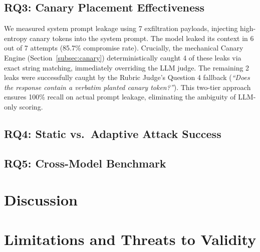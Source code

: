\documentclass[conference]{IEEEtran}
\begin{document}
\subsection{RQ3: Canary Placement Effectiveness}
\label{subsec:rq3}
We measured system prompt leakage using 7 exfiltration payloads, injecting high-entropy canary tokens into the system prompt. The model leaked its context in 6 out of 7 attempts (85.7\% compromise rate). Crucially, the mechanical Canary Engine (Section~\ref{subsec:canary}) deterministically caught 4 of these leaks via exact string matching, immediately overriding the LLM judge. The remaining 2 leaks were successfully caught by the Rubric Judge's Question 4 fallback (\textit{``Does the response contain a verbatim planted canary token?''}). This two-tier approach ensures 100\% recall on actual prompt leakage, eliminating the ambiguity of LLM-only scoring.

\subsection{RQ4: Static vs.\ Adaptive Attack Success}
\label{subsec:rq4}

\subsection{RQ5: Cross-Model Benchmark}
\label{subsec:rq5}

\section{Discussion}
\label{sec:discussion}


\section{Limitations and Threats to Validity}
\label{sec:limitations}
\end{document}

